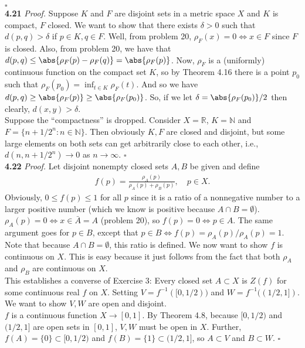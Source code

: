 \documentclass[11pt]{article}
\begin{document}
\hfill $\square$\\

\noindent \textbf{4.21}
\noindent \textit{Proof.} Suppose $K$ and $F$ are disjoint sets in a metric space $X$ and $K$ is compact, $F$ closed. We want to show that there exists $\delta > 0$ such that $d(p,q) > \delta$ if $p \in K, q\in F$. Well, from problem 20, $\rho_F(x) = 0 \iff x \in F$ since $F$ is closed. Also, from problem 20, we have that $d(p,q) \leq \abs{\rho_F(p) - \rho_F(q)} = \abs{\rho_F(p)}$.  Now, $\rho_F$ is a (uniformly) continuous function on the compact set $K$, so by Theorem 4.16 there is a point $p_0$ such that $\rho_F(p_0) = \inf_{t \in K} \rho_F(t) $. And so we have $d(p,q) \geq \abs{\rho_F(p)} \geq \abs{\rho_F(p_0)}$. So, if we let $\delta = \abs{\rho_F(p_0)}/2$ then clearly, $d(x,y) > \delta$.  \\


Suppose the ``compactness'' is dropped. Consider $X = \mathbb{R}$, $K = \mathbb{N}$ and $F = \{ n+1/2^n : n\in \mathbb{N}\}$. Then obviously $K,F$ are closed and disjoint, but some large elements on both sets can get arbitrarily close to each other, i.e., $d(n,n+1/2^n) \to 0$ as $n\to \infty$. \hfill $\square$\\ 


\noindent \textbf{4.22}
\noindent \textit{Proof.}  Let disjoint nonempty closed sets $A,B$ be given and define 
\begin{align*}
f(p) = \frac{\rho_A(p)}{\rho_A(p) + \rho_B(p)}, \quad p \in X.
\end{align*}
Obviously, $0 \leq f(p) \leq 1$ for all $p$ since it is a ratio of a nonnegative number to a larger positive number (which we know is positive because $A\cap B = \emptyset$). $\rho_A(p) = 0 \iff x\in \bar{A} = A$ (problem 20), so $f(p) = 0 \iff p \in A$. The same argument goes for $p \in B$, except that $p \in B \iff f(p) = \rho_A(p)/\rho_A(p) = 1$. Note that because $A \cap B = \emptyset$, this ratio is defined. We now want to show $f$ is continuous on $X$. This is easy because it just follows from the fact that both $\rho_A$ and $\rho_B$ are continuous on $X$. \\

This establishes a converse of Exercise 3: Every closed set $A \subset X$ is $Z(f)$ for some continuous real $f$ on $X$. Setting $V = f^{-1}([0,1/2))$ and $W = f^{-1}((1/2,1])$. We want to show $V,W$ are open and disjoint.\\

$f$ is a continuous function $X \to [0,1]$. By Theorem 4.8, because $[0,1/2)$ and $(1/2,1]$ are open sets in $[0,1]$, $V,W$ must be open in $X$. Further, $f(A) = \{ 0\} \subset [0,1/2)$ and $f(B) = \{1\} \subset (1/2,1]$, so $A\subset V$ and $B \subset W$. \hfill $\square$ \\
\end{document}
